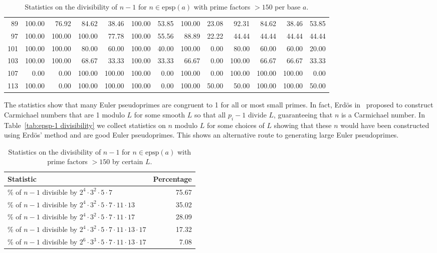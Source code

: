 \documentclass[runningheads]{amsart}
\newcommand{\epsp}{\mathrm{epsp}}
\begin{document}
\begin{table}
\begin{tiny}
\begin{tabular}{r|r|r|r|r|r|r|r|r|r|r|r|r}
89
 &
100.00
&
76.92
&
84.62
&
38.46
&
100.00
&
53.85
&
100.00
&
23.08
&
92.31
&
84.62
&
38.46
&
53.85
\\
97
 &
100.00
&
100.00
&
100.00
&
77.78
&
100.00
&
55.56
&
88.89
&
22.22
&
44.44
&
44.44
&
44.44
&
44.44
\\
101
&
100.00
&
100.00
&
80.00
&
60.00
&
100.00
&
40.00
&
100.00
&
0.00
&
80.00
&
60.00
&
60.00
&
20.00
\\
103
&
100.00
&
100.00
&
68.67
&
33.33
&
100.00
&
33.33
&
66.67
&
0.00
&
100.00
&
66.67
&
66.67
&
33.33
\\
107
&
0.00
&
0.00
&
100.00
&
100.00
&
100.00
&
0.00
&
100.00
&
0.00
&
100.00
&
100.00
&
100.00
&
0.00
\\
113
&
100.00
&
0.00
&
100.00
&
100.00
&
100.00
&
0.00
&
100.00
&
50.00
&
50.00
&
100.00
&
100.00
&
50.00
\\
\end{tabular}
\end{tiny}
\caption{Statistics on the divisibility of $n-1$ for $n\in \epsp(a)$ with prime factors $>150$ per base $a$.}
\label{tab:epsp-1 divisibility per base}
\end{table}


The statistics show that many Euler pseudoprimes are congruent to 1 for all or most
small primes.
In fact,
Erdös
in~\cite{ErdosCarmichaelConstruction}
proposed to construct Carmichael numbers that are 1 modulo $L$ for some smooth $L$
so that all
$p_i-1$
divide $L$,
guaranteeing that $n$ is a Carmichael number.
In
Table~\ref{tab:epsp-1
divisibility}
we collect statistics on $n$ modulo $L$ for some choices of $L$ showing that these
$n$ would have been constructed using
Erdös'
method and are good Euler pseudoprimes.
This shows an alternative route to generating large Euler pseudoprimes.

\begin{table}[h]
\centering
\begin{tabular}{l|r}
Statistic
&
Percentage
\\
\hline
\% of $n-1$ divisible by $2^4 \cdot 3^2 \cdot 5 \cdot 7$ &  75.67 \\
\% of $n-1$ divisible by $2^4 \cdot 3^2 \cdot 5 \cdot 7 \cdot 11 \cdot 13$ &35.02 \\
\% of $n-1$ divisible by $2^4 \cdot 3^2 \cdot 5 \cdot 7 \cdot 11 \cdot 17$ & 28.09 \\
\% of $n-1$ divisible by $2^4 \cdot 3^2 \cdot 5 \cdot 7 \cdot 11 \cdot 13 \cdot 17$ & 17.32 \\
\% of $n-1$ divisible by $2^6 \cdot 3^3 \cdot 5 \cdot 7 \cdot 11 \cdot 13 \cdot 17$ & 7.08 \\
\end{tabular}
\caption{Statistics on the divisibility of $n-1$ for $n\in\epsp(a)$ with prime factors $>150$ by certain $L$.}
\label{tab:epsp-1 divisibility}
\end{table}
\end{document}
